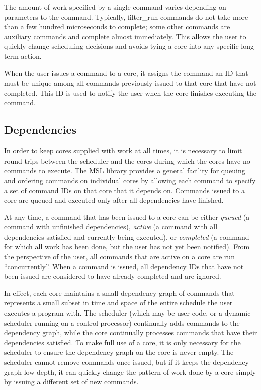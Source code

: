 The amount of work specified by a single command varies depending on
parameters to the command. Typically, \textsf{filter\_run} commands do
not take more than a few hundred microseconds to complete; some other
commands are auxiliary commands and complete almost immediately. This
allows the user to quickly change scheduling decisions and avoids
tying a core into any specific long-term action.

When the user issues a command to a core, it assigns the command an ID
that must be unique among all commands previously issued to that core
that have not completed. This ID is used to notify the user when the
core finishes executing the command.

\subsection{Dependencies}

In order to keep cores supplied with work at all times, it is
necessary to limit round-trips between the scheduler and the cores
during which the cores have no commands to execute. The MSL library
provides a general facility for queuing and ordering commands on
individual cores by allowing each command to specify a set of command
IDs on that core that it depends on. Commands issued to a core are
queued and executed only after all dependencies have finished.

At any time, a command that has been issued to a core can be either
\emph{queued} (a command with unfinished dependencies), \emph{active}
(a command with all dependencies satisfied and currently being
executed), or \emph{completed} (a command for which all work has been
done, but the user has not yet been notified). From the perspective of
the user, all commands that are active on a core are run
``concurrently''. When a command is issued, all dependency IDs that
have not been issued are considered to have already completed and are
ignored.

In effect, each core maintains a small dependency graph of commands
that represents a small subset in time and space of the entire
schedule the user executes a program with. The scheduler (which may be
user code, or a dynamic scheduler running on a control processor)
continually adds commands to the dependency graph, while the core
continually processes commands that have their dependencies
satisfied. To make full use of a core, it is only necessary for the
scheduler to ensure the dependency graph on the core is never
empty. The scheduler cannot remove commands once issued, but if it
keeps the dependency graph low-depth, it can quickly change the
pattern of work done by a core simply by issuing a different set of
new commands.

